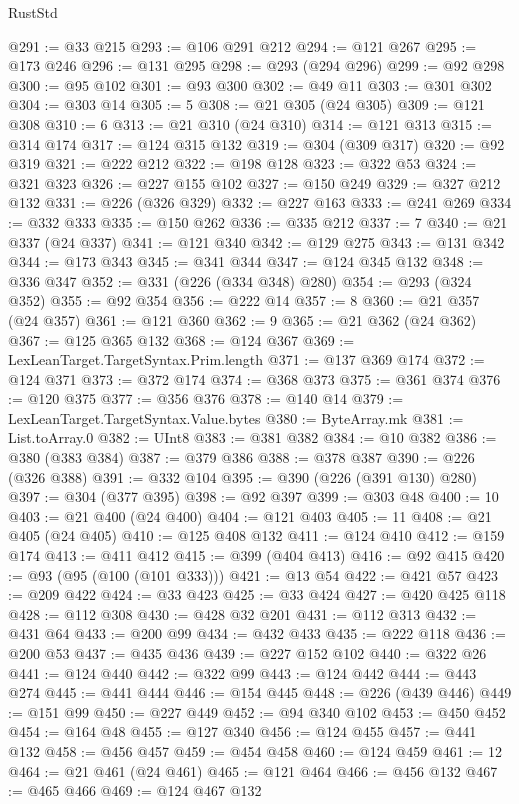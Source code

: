 \begin{lexlean}{RustStd}
\begin{coremodule}
{\begin{coremodule}
{{{{{{{{{{{{{{{{{{{{{{{{{{{{{{{{{{{{{@291 := @33 @215
@293 := @106 @291 @212
@294 := @121 @267
@295 := @173 @246
@296 := @131 @295
@298 := @293 (@294 @296)
@299 := @92 @298
@300 := @95 @102
@301 := @93 @300
@302 := @49 @11
@303 := @301 @302
@304 := @303 @14
@305 := 5
@308 := @21 @305 (@24 @305)
@309 := @121 @308
@310 := 6
@313 := @21 @310 (@24 @310)
@314 := @121 @313
@315 := @314 @174
@317 := @124 @315 @132
@319 := @304 (@309 @317)
@320 := @92 @319
@321 := @222 @212
@322 := @198 @128
@323 := @322 @53
@324 := @321 @323
@326 := @227 @155 @102
@327 := @150 @249
@329 := @327 @212 @132
@331 := @226 (@326 @329)
@332 := @227 @163
@333 := @241 @269
@334 := @332 @333
@335 := @150 @262
@336 := @335 @212
@337 := 7
@340 := @21 @337 (@24 @337)
@341 := @121 @340
@342 := @129 @275
@343 := @131 @342
@344 := @173 @343
@345 := @341 @344
@347 := @124 @345 @132
@348 := @336 @347
@352 := @331 (@226 (@334 @348) @280)
@354 := @293 (@324 @352)
@355 := @92 @354
@356 := @222 @14
@357 := 8
@360 := @21 @357 (@24 @357)
@361 := @121 @360
@362 := 9
@365 := @21 @362 (@24 @362)
@367 := @125 @365 @132
@368 := @124 @367
@369 := LexLeanTarget.TargetSyntax.Prim.length
@371 := @137 @369 @174
@372 := @124 @371
@373 := @372 @174
@374 := @368 @373
@375 := @361 @374
@376 := @120 @375
@377 := @356 @376
@378 := @140 @14
@379 := LexLeanTarget.TargetSyntax.Value.bytes
@380 := ByteArray.mk
@381 := List.toArray.{0}
@382 := UInt8
@383 := @381 @382
@384 := @10 @382
@386 := @380 (@383 @384)
@387 := @379 @386
@388 := @378 @387
@390 := @226 (@326 @388)
@391 := @332 @104
@395 := @390 (@226 (@391 @130) @280)
@397 := @304 (@377 @395)
@398 := @92 @397
@399 := @303 @48
@400 := 10
@403 := @21 @400 (@24 @400)
@404 := @121 @403
@405 := 11
@408 := @21 @405 (@24 @405)
@410 := @125 @408 @132
@411 := @124 @410
@412 := @159 @174
@413 := @411 @412
@415 := @399 (@404 @413)
@416 := @92 @415
@420 := @93 (@95 (@100 (@101 @333)))
@421 := @13 @54
@422 := @421 @57
@423 := @209 @422
@424 := @33 @423
@425 := @33 @424
@427 := @420 @425 @118
@428 := @112 @308
@430 := @428 @32 @201
@431 := @112 @313
@432 := @431 @64
@433 := @200 @99
@434 := @432 @433
@435 := @222 @118
@436 := @200 @53
@437 := @435 @436
@439 := @227 @152 @102
@440 := @322 @26
@441 := @124 @440
@442 := @322 @99
@443 := @124 @442
@444 := @443 @274
@445 := @441 @444
@446 := @154 @445
@448 := @226 (@439 @446)
@449 := @151 @99
@450 := @227 @449
@452 := @94 @340 @102
@453 := @450 @452
@454 := @164 @48
@455 := @127 @340
@456 := @124 @455
@457 := @441 @132
@458 := @456 @457
@459 := @454 @458
@460 := @124 @459
@461 := 12
@464 := @21 @461 (@24 @461)
@465 := @121 @464
@466 := @456 @132
@467 := @465 @466
@469 := @124 @467 @132
}}}}}}}}}}}}}}}}}}}}}}}}}}}}}}}}}}}}}
\end{coremodule}}
\end{coremodule}
\end{lexlean}
